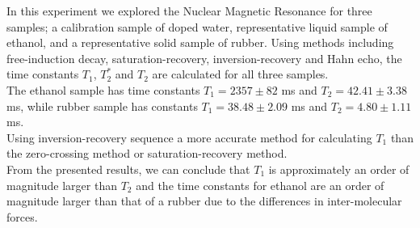 In this experiment we explored the Nuclear Magnetic Resonance for three samples; a calibration sample of doped water, representative liquid sample of ethanol, and a representative solid sample of rubber. Using methods including free-induction decay, saturation-recovery, inversion-recovery and Hahn echo, the time constants $T_1$, $T_2^*$ and $T_2$ are calculated for all three samples.\\

The ethanol sample has time constants $T_1 = 2357\pm 82$ ms and $T_2=42.41\pm 3.38$ ms, while rubber sample has constants $T_1 = 38.48\pm 2.09$ ms and $T_2 = 4.80\pm1.11$ ms. \\

Using inversion-recovery sequence a more accurate method for calculating $T_1$ than the zero-crossing method or saturation-recovery method. \\

From the presented results, we can conclude that $T_1$ is approximately an order of magnitude larger than $T_2$ and the time constants for ethanol are an order of magnitude larger than that of a rubber due to the differences in inter-molecular forces.\\
